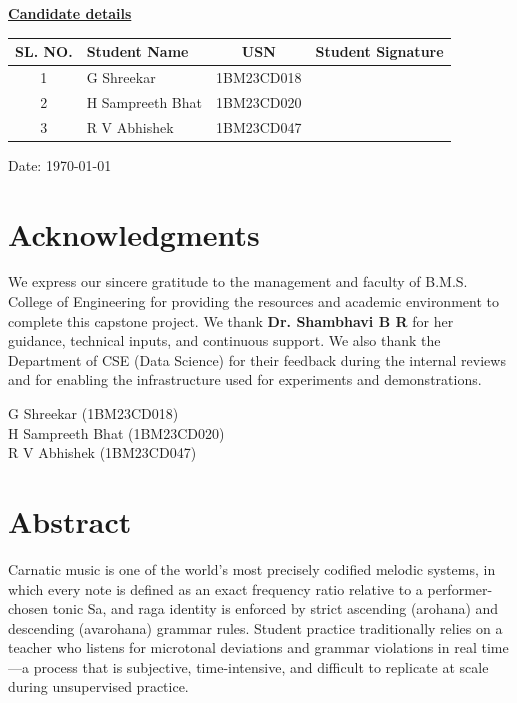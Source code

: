 \documentclass[12pt,a4paper]{report}
\numberwithin{equation}{chapter}
\begin{document}
\vspace{0.3cm}
\begin{center}
    \textbf{\underline{Candidate details}}
\end{center}

\begin{center}
\begin{tabularx}{\textwidth}{|c|X|c|c|}
    \hline
    \textbf{SL. NO.} & \textbf{Student Name} & \textbf{USN} & \textbf{Student Signature} \\
    \hline
    1 & G Shreekar & 1BM23CD018 & \\
    \hline
    2 & H Sampreeth Bhat & 1BM23CD020 & \\
    \hline
    3 & R V Abhishek & 1BM23CD047 & \\
    \hline
\end{tabularx}
\end{center}

\vspace{0.9cm}
\begin{flushleft}
    Date: \mydateformat\today
\end{flushleft}

\newpage
\chapter*{Acknowledgments}
\thispagestyle{romanstyle}
\noindent
We express our sincere gratitude to the management and faculty of B.M.S. College of Engineering for providing the resources and academic environment to complete this capstone project. We thank \textbf{Dr. Shambhavi B R} for her guidance, technical inputs, and continuous support. We also thank the Department of CSE (Data Science) for their feedback during the internal reviews and for enabling the infrastructure used for experiments and demonstrations.

\vspace{1.2cm}
\begin{flushright}
G Shreekar (1BM23CD018)\\
H Sampreeth Bhat (1BM23CD020)\\
R V Abhishek (1BM23CD047)\\
\end{flushright}

\newpage
\chapter*{Abstract}
\thispagestyle{romanstyle}
Carnatic music is one of the world's most precisely codified melodic systems, in which every note is defined as an exact frequency ratio relative to a performer-chosen tonic Sa, and raga identity is enforced by strict ascending (arohana) and descending (avarohana) grammar rules. Student practice traditionally relies on a teacher who listens for microtonal deviations and grammar violations in real time---a process that is subjective, time-intensive, and difficult to replicate at scale during unsupervised practice.
\end{document}
